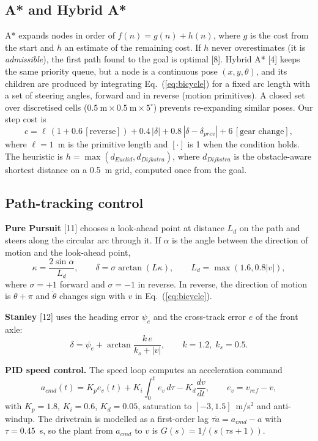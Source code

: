\documentclass[12pt,a4paper]{article}
\begin{document}
\subsection{A* and Hybrid A*}
A* expands nodes in order of $f(n) = g(n) + h(n)$, where $g$ is the cost from the start and $h$ an estimate of the remaining cost. If $h$ never overestimates (it is \emph{admissible}), the first path found to the goal is optimal [8]. Hybrid A* [4] keeps the same priority queue, but a node is a continuous pose $(x, y, \theta)$, and its children are produced by integrating Eq.~(\ref{eq:bicycle}) for a fixed arc length with a set of steering angles, forward and in reverse (motion primitives). A closed set over discretised cells ($0.5~\text{m} \times 0.5~\text{m} \times 5^\circ$) prevents re-expanding similar poses. Our step cost is
\begin{equation}
c = \ell\,(1 + 0.6\,[\text{reverse}]) + 0.4\,|\delta| + 0.8\,|\delta - \delta_{prev}| + 6\,[\text{gear change}],
\label{eq:cost}
\end{equation}
where $\ell = 1$~m is the primitive length and $[\cdot]$ is 1 when the condition holds. The heuristic is $h = \max(d_{Euclid}, d_{Dijkstra})$, where $d_{Dijkstra}$ is the obstacle-aware shortest distance on a 0.5~m grid, computed once from the goal.

\subsection{Path-tracking control}
\textbf{Pure Pursuit} [11] chooses a look-ahead point at distance $L_d$ on the path and steers along the circular arc through it. If $\alpha$ is the angle between the direction of motion and the look-ahead point,
\begin{equation}
\kappa = \frac{2\sin\alpha}{L_d}, \qquad \delta = \sigma \arctan(L\kappa), \qquad L_d = \max(1.6, 0.8|v|),
\label{eq:pp}
\end{equation}
where $\sigma = +1$ forward and $\sigma = -1$ in reverse. In reverse, the direction of motion is $\theta + \pi$ and $\dot\theta$ changes sign with $v$ in Eq.~(\ref{eq:bicycle}).

\textbf{Stanley} [12] uses the heading error $\psi_e$ and the cross-track error $e$ of the front axle:
\begin{equation}
\delta = \psi_e + \arctan\frac{k\,e}{k_s + |v|}, \qquad k = 1.2,\; k_s = 0.5.
\label{eq:stanley}
\end{equation}

\textbf{PID speed control.} The speed loop computes an acceleration command
\begin{equation}
a_{cmd}(t) = K_p e_v(t) + K_i \int_0^t e_v\,d\tau - K_d \frac{dv}{dt}, \qquad e_v = v_{ref} - v,
\label{eq:pid}
\end{equation}
with $K_p = 1.8$, $K_i = 0.6$, $K_d = 0.05$, saturation to $[-3, 1.5]$~m/s$^2$ and anti-windup. The drivetrain is modelled as a first-order lag $\tau\dot a = a_{cmd} - a$ with $\tau = 0.45$~s, so the plant from $a_{cmd}$ to $v$ is $G(s) = 1/(s(\tau s + 1))$.
\end{document}
